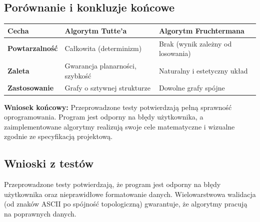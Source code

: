 \documentclass[12pt,a4paper]{article}
\begin{document}
\subsection{Porównanie i konkluzje końcowe}
\begin{table}[h]
\centering
\begin{tabular}{|l|p{5cm}|p{5cm}|}
\hline
\textbf{Cecha} & \textbf{Algorytm Tutte’a} & \textbf{Algorytm Fruchtermana} \\ \hline
\textbf{Powtarzalność} & Całkowita (determinizm) & Brak (wynik zależny od losowania) \\ \hline
\textbf{Zaleta} & Gwarancja planarności, szybkość & Naturalny i estetyczny układ \\ \hline
\textbf{Zastosowanie} & Grafy o sztywnej strukturze & Dowolne grafy spójne \\ \hline
\end{tabular}
\end{table}

\textbf{Wniosek końcowy:} Przeprowadzone testy potwierdzają pełną sprawność oprogramowania. Program jest odporny na błędy użytkownika, a zaimplementowane algorytmy realizują swoje cele matematyczne i wizualne zgodnie ze specyfikacją projektową.

\subsection{Wnioski z testów}
Przeprowadzone testy potwierdzają, że program jest odporny na błędy użytkownika oraz nieprawidłowe formatowanie danych. Wielowarstwowa walidacja (od znaków ASCII po spójność topologiczną) gwarantuje, że algorytmy pracują na poprawnych danych.
\end{document}
